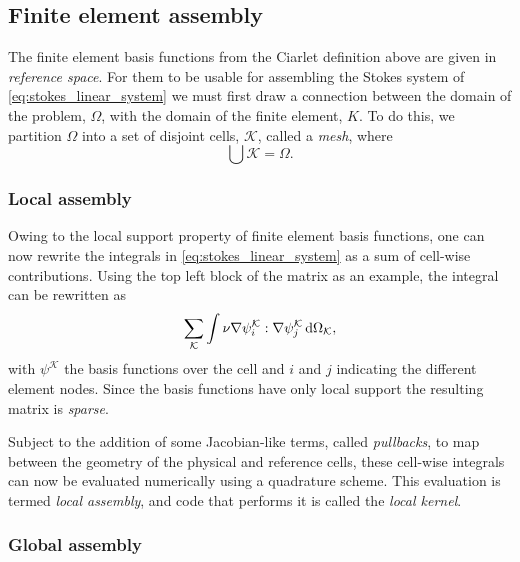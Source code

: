 \documentclass[thesis]{subfiles}
\begin{document}

\subsection{Finite element assembly}

The finite element basis functions from the Ciarlet definition above are given in \emph{reference space}.
For them to be usable for assembling the Stokes system of \cref{eq:stokes_linear_system} we must first draw a connection between the domain of the problem, $\Omega$, with the domain of the finite element, $K$.
To do this, we partition $\Omega$ into a set of disjoint cells, $\mathcal{K}$, called a \emph{mesh}, where
\begin{equation}
  \bigcup \mathcal{K} = \Omega.
\end{equation}

\subsubsection{Local assembly}

Owing to the local support property of finite element basis functions, one can now rewrite the integrals in \cref{eq:stokes_linear_system} as a sum of cell-wise contributions.
Using the top left block of the matrix as an example, the integral can be rewritten as
\begin{equation}
  \sum_{\mathcal{K}} \int \nu \nabla \psi_i^{\mathcal{K}} : \nabla \psi_j^{\mathcal{K}} \, \textnormal{d}\Omega_{\mathcal{K}},
\end{equation}
with $\psi^{\mathcal{K}}$ the basis functions over the cell and $i$ and $j$ indicating the different element nodes.
Since the basis functions have only local support the resulting matrix is \emph{sparse}.

Subject to the addition of some Jacobian-like terms, called \emph{pullbacks}, to map between the geometry of the physical and reference cells, these cell-wise integrals can now be evaluated numerically using a quadrature scheme.
This evaluation is termed \emph{local assembly}, and code that performs it is called the \emph{local kernel}.

\subsubsection{Global assembly}
\end{document}
